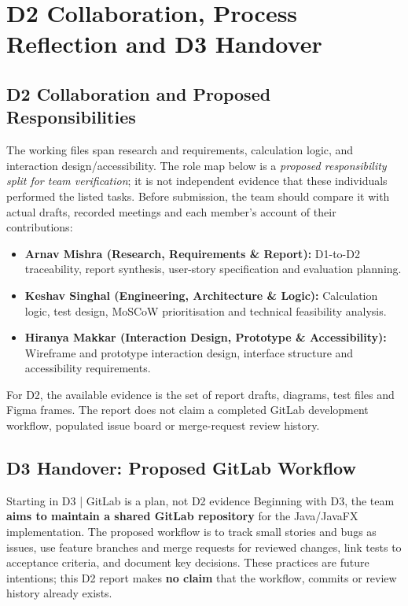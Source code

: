 \documentclass[12pt,a4paper]{article}
\begin{document}
\section{D2 Collaboration, Process Reflection and D3 Handover}

\subsection{D2 Collaboration and Proposed Responsibilities}
The working files span research and requirements, calculation logic, and interaction design/accessibility. The role map below is a \emph{proposed responsibility split for team verification}; it is not independent evidence that these individuals performed the listed tasks. Before submission, the team should compare it with actual drafts, recorded meetings and each member's account of their contributions:
\begin{itemize}[leftmargin=*]
  \item \textbf{Arnav Mishra (Research, Requirements \& Report):} D1-to-D2 traceability, report synthesis, user-story specification and evaluation planning.
  \item \textbf{Keshav Singhal (Engineering, Architecture \& Logic):} Calculation logic, test design, MoSCoW prioritisation and technical feasibility analysis.
  \item \textbf{Hiranya Makkar (Interaction Design, Prototype \& Accessibility):} Wireframe and prototype interaction design, interface structure and accessibility requirements.
\end{itemize}
For D2, the available evidence is the set of report drafts, diagrams, test files and Figma frames. The report does not claim a completed GitLab development workflow, populated issue board or merge-request review history.

\subsection{D3 Handover: Proposed GitLab Workflow}
\begin{insightbox}{Starting in D3 | GitLab is a plan, not D2 evidence}
Beginning with D3, the team \textbf{aims to maintain a shared GitLab repository} for the Java/JavaFX implementation. The proposed workflow is to track small stories and bugs as issues, use feature branches and merge requests for reviewed changes, link tests to acceptance criteria, and document key decisions. These practices are future intentions; this D2 report makes \textbf{no claim} that the workflow, commits or review history already exists.
\end{insightbox}
\end{document}
